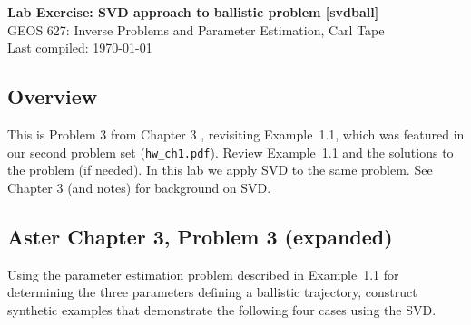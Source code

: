 \documentclass[11pt,titlepage,fleqn]{article}
\begin{document}

\begin{spacing}{1.2}
\centering
{\large \bf Lab Exercise: SVD approach to ballistic problem [svdball]} \\
GEOS 627: Inverse Problems and Parameter Estimation, Carl Tape \\
Last compiled: \today
\end{spacing}


\subsection*{Overview}

This is Problem 3 from Chapter 3 \citep{Aster}, revisiting Example~1.1, which was featured in our second problem set (\verb+hw_ch1.pdf+). Review Example~1.1 and the solutions to the problem (if needed). In this lab we apply SVD to the same problem. See Chapter 3 (and notes) for background on SVD.


\subsection*{Aster Chapter 3, Problem 3 (expanded)}

Using the parameter estimation problem described in Example~1.1 for determining the three parameters defining a ballistic trajectory, construct synthetic examples that demonstrate the following four cases using the SVD.
\end{document}
